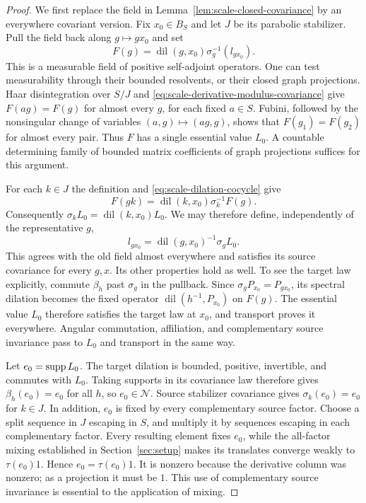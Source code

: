 \begin{proof}
We first replace the field in
Lemma~\ref{lem:scale-closed-covariance} by an everywhere covariant
version.  Fix $x_0\in B_S$ and let $J$ be its parabolic stabilizer.
Pull the field back along $g\mapsto gx_0$ and set
\[
 F(g)=\operatorname{dil}(g,x_0)\sigma_g^{-1}(l_{gx_0}).
\]
This is a measurable field of positive self-adjoint operators.  One
can test measurability through their bounded resolvents, or their
closed graph projections.  Haar disintegration over $S/J$ and
\eqref{eq:scale-derivative-modulus-covariance} give
$F(ag)=F(g)$ for almost every $g$, for each fixed $a\in S$.
Fubini, followed by the nonsingular change of variables
$(a,g)\mapsto(ag,g)$, shows that $F(g_1)=F(g_2)$ for almost every pair.
Thus $F$ has a single essential value $L_0$.  A countable determining
family of bounded matrix coefficients of graph projections suffices
for this argument.

For each $k\in J$ the definition and
\eqref{eq:scale-dilation-cocycle} give
\[
 F(gk)=\operatorname{dil}(k,x_0)\sigma_k^{-1}F(g).
\]
Consequently $\sigma_kL_0=\operatorname{dil}(k,x_0)L_0$.  We may
therefore define, independently of the representative $g$,
\[
 l_{gx_0}=\operatorname{dil}(g,x_0)^{-1}\sigma_gL_0.
\]
This agrees with the old field almost everywhere and satisfies its
source covariance for every $g,x$.  Its other properties hold as well.
To see the target law explicitly, commute $\beta_h$ past $\sigma_g$
in the pullback.  Since $\sigma_gP_{x_0}=P_{gx_0}$, its spectral
dilation becomes the fixed operator
$\operatorname{dil}(h^{-1},P_{x_0})$ on $F(g)$.  The essential value
$L_0$ therefore satisfies the target law at $x_0$, and transport proves
it everywhere.  Angular commutation, affiliation, and complementary
source invariance pass to $L_0$ and transport in the same way.

Let $e_0=\operatorname{supp} L_0$.  The target dilation is bounded, positive,
invertible, and commutes with $L_0$.  Taking supports in its covariance
law therefore gives $\beta_h(e_0)=e_0$ for all $h$, so $e_0\in\mathcal N$.
Source stabilizer covariance gives $\sigma_k(e_0)=e_0$ for $k\in J$.
In addition, $e_0$ is fixed by every complementary source factor.
Choose a split sequence in $J$ escaping in $S$, and multiply it by
sequences escaping in each complementary factor.  Every resulting
element fixes $e_0$, while the all-factor mixing established in Section~\ref{sec:setup}
makes its translates converge weakly to $\tau(e_0)1$.  Hence
$e_0=\tau(e_0)1$.  It is nonzero because the derivative column was
nonzero; as a projection it must be $1$.  This use of complementary
source invariance is essential to the application of mixing.


\end{proof}
